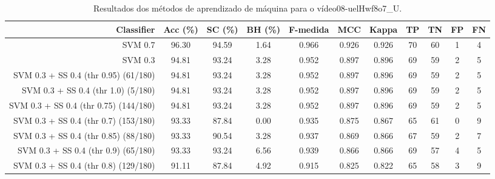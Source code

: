 \begin{table}[!htb]
\centering
\caption{Resultados dos métodos de aprendizado de máquina para o vídeo08-uelHwf8o7_U.}
\label{tab:08-uelHwf8o7_U}
\begin{tabular}{r|c|c|c|c|c|c|c|c|c|c}
\hline\hline
Classifier & Acc (\%) & SC (\%) & BH (\%) & F-medida & MCC & Kappa & TP & TN & FP & FN \\ \hline
SVM 0.7 & 96.30 & 94.59 & 1.64 & 0.966 & 0.926 & 0.926 & 70 & 60 & 1 & 4 \\ 
SVM 0.3 & 94.81 & 93.24 & 3.28 & 0.952 & 0.897 & 0.896 & 69 & 59 & 2 & 5 \\ 
SVM 0.3 + SS 0.4 (thr 0.95) (61/180) & 94.81 & 93.24 & 3.28 & 0.952 & 0.897 & 0.896 & 69 & 59 & 2 & 5 \\ 
SVM 0.3 + SS 0.4 (thr 1.0) (5/180) & 94.81 & 93.24 & 3.28 & 0.952 & 0.897 & 0.896 & 69 & 59 & 2 & 5 \\ 
SVM 0.3 + SS 0.4 (thr 0.75) (144/180) & 94.81 & 93.24 & 3.28 & 0.952 & 0.897 & 0.896 & 69 & 59 & 2 & 5 \\ 
SVM 0.3 + SS 0.4 (thr 0.7) (153/180) & 93.33 & 87.84 & 0.00 & 0.935 & 0.875 & 0.867 & 65 & 61 & 0 & 9 \\ 
SVM 0.3 + SS 0.4 (thr 0.85) (88/180) & 93.33 & 90.54 & 3.28 & 0.937 & 0.869 & 0.866 & 67 & 59 & 2 & 7 \\ 
SVM 0.3 + SS 0.4 (thr 0.9) (65/180) & 93.33 & 93.24 & 6.56 & 0.939 & 0.866 & 0.866 & 69 & 57 & 4 & 5 \\ 
SVM 0.3 + SS 0.4 (thr 0.8) (129/180) & 91.11 & 87.84 & 4.92 & 0.915 & 0.825 & 0.822 & 65 & 58 & 3 & 9 \\ 
\hline\hline
\end{tabular}
\end{table}
